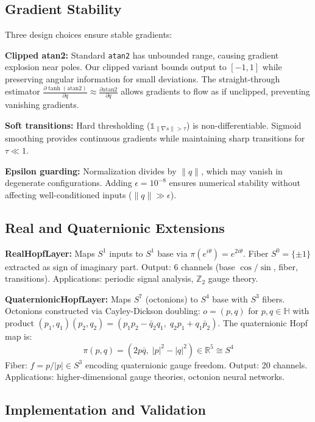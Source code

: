 \documentclass[10pt,twocolumn]{article}
\newcommand{\RR}{\mathbb{R}}
\newcommand{\HH}{\mathbb{H}}
\begin{document}
\subsection{Gradient Stability}

Three design choices ensure stable gradients:

\textbf{Clipped atan2:} Standard \texttt{atan2} has unbounded range, causing gradient explosion near poles. Our clipped variant bounds output to $[-1,1]$ while preserving angular information for small deviations. The straight-through estimator $\frac{\partial \tanh(\text{atan2})}{\partial q} \approx \frac{\partial \text{atan2}}{\partial q}$ allows gradients to flow as if unclipped, preventing vanishing gradients.

\textbf{Soft transitions:} Hard thresholding ($\mathbb{1}_{\|\nabla s\| > \tau}$) is non-differentiable. Sigmoid smoothing provides continuous gradients while maintaining sharp transitions for $\tau \ll 1$.

\textbf{Epsilon guarding:} Normalization divides by $\|q\|$, which may vanish in degenerate configurations. Adding $\epsilon=10^{-8}$ ensures numerical stability without affecting well-conditioned inputs ($\|q\| \gg \epsilon$).

\subsection{Real and Quaternionic Extensions}

\textbf{RealHopfLayer:} Maps $S^1$ inputs to $S^1$ base via $\pi(e^{i\theta}) = e^{2i\theta}$. Fiber $S^0 = \{\pm 1\}$ extracted as sign of imaginary part. Output: 6 channels (base $\cos/\sin$, fiber, transitions). Applications: periodic signal analysis, $\mathbb{Z}_2$ gauge theory.

\textbf{QuaternionicHopfLayer:} Maps $S^7$ (octonions) to $S^4$ base with $S^3$ fibers. Octonions constructed via Cayley-Dickson doubling: $o = (p, q)$ for $p, q \in \HH$ with product $(p_1, q_1)(p_2, q_2) = (p_1 p_2 - \bar{q}_2 q_1,\; q_2 p_1 + q_1 \bar{p}_2)$. The quaternionic Hopf map is:
\begin{equation}
\pi(p, q) = \left(2p\bar{q},\; |p|^2 - |q|^2\right) \in \RR^5 \cong S^4
\end{equation}
Fiber: $f = p/|p| \in S^3$ encoding quaternionic gauge freedom. Output: 20 channels. Applications: higher-dimensional gauge theories, octonion neural networks.

\subsection{Implementation and Validation}
\end{document}
